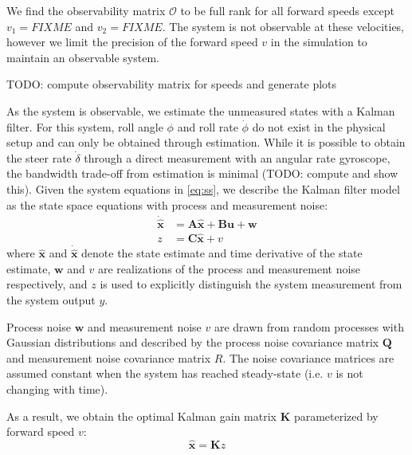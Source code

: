 \documentclass[11pt,a4paper,reqno]{amsart}
\newcommand{\sysInput}{\bm{u}}
\newcommand{\sysOutput}{y}
\newcommand{\stateMat}{\bm{A}}
\newcommand{\inputMat}{\bm{B}}
\newcommand{\outputMat}{\bm{C}}
\newcommand{\dstateEst}{\dot{\hat{\bm{x}}}}
\newcommand{\stateEst}{\hat{\bm{x}}}
\newcommand{\meas}{z}
\newcommand{\processCov}{\bm{Q}}
\newcommand{\processNoise}{\bm{w}}
\newcommand{\measCov}{R}
\newcommand{\measNoise}{v}
\newcommand{\kalmanGain}{\bm{K}}
\newcommand{\estimateCov}{\bm{P}}
\begin{document}
We find the observability matrix $ \bm{\mathcal{O}} $ to be full rank for all forward speeds except
$ v_1 = FIXME $ and $ v_2 = FIXME $.
The system is not observable at these velocities, however we limit the precision of the forward speed $ v $ in the
simulation to maintain an observable system.

TODO: compute observability matrix for speeds and generate plots


As the system is observable, we estimate the unmeasured states with a Kalman filter.
For this system, roll angle $ \phi $ and roll rate $ \dot{\phi} $ do not exist in the physical setup and can only be
obtained through estimation.
While it is possible to obtain the steer rate $ \dot{\delta} $ through a direct measurement with an angular rate
gyroscope, the bandwidth trade-off from estimation is minimal (TODO: compute and show this).
Given the system equations in \autoref{eq:ss}, we describe the Kalman filter model as the state space equations with
process and measurement noise:
\begin{equation}
\begin{aligned}
    \dstateEst &= \stateMat \stateEst + \inputMat \sysInput + \processNoise \\
    \meas &= \outputMat \stateEst + \measNoise \label{eq:kalman_ss}
\end{aligned}
\end{equation}
where $ \stateEst $ and $ \dstateEst $ denote the state estimate and time derivative of the state estimate,
$ \processNoise $ and $ \measNoise $ are realizations of the process and measurement noise respectively,
and $ \meas $ is used to explicitly distinguish the system measurement from the system output $ \sysOutput $.

Process noise $ \processNoise $ and measurement noise $ \measNoise $ are drawn from random processes with
Gaussian distributions and described by the
process noise covariance matrix $ \processCov $ and measurement noise covariance matrix $ \measCov $.
The noise covariance matrices are assumed constant when the system has reached steady-state
(i.e. $ v $ is not changing with time). %

As a result, we obtain the optimal Kalman gain matrix $ \kalmanGain $
parameterized by forward speed $ v $:
\begin{equation}
    \stateEst = \kalmanGain \meas
\end{equation}
\end{document}
